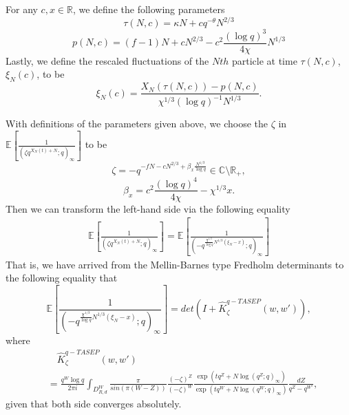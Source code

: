 \begin{definition}
For any $c,x \in \mathbb{R}$, we define the following parameters
\begin{equation*}
\tau(N,c) = \kappa N + cq^{-\theta}N^{2/3}
\end{equation*}
\begin{equation*}
p(N,c) = (f-1)N + cN^{2/3} - c^2 \frac{(\log q)^3}{4 \chi} N^{1/3}
\end{equation*}
Lastly, we define the rescaled fluctuations of the $Nth$ particle at time $\tau(N,c)$, $\xi_N(c)$, to be $$\xi_N(c) = \frac{X_N(\tau(N,c)) - p(N,c)}{\chi^{1/3} (\log q)^{-1} N^{1/3}}.$$
\end{definition}

With definitions of the parameters given above, we choose the $\zeta$ in $\mathbb{E} \left[ \frac{1}{(\zeta q^{X_N(t)+N}; q)_{\infty}} \right]$ to be 
\begin{equation*}
\zeta = -q^{-fN - cN^{2/3} + \beta_x \frac{N^{1/3}}{\log q}} \in \mathbb{C} \setminus \mathbb{R}_+,
\end{equation*}
\begin{equation*}
\beta_x = c^2 \frac{(\log q)^4}{4 \chi} - \chi^{1/3} x.
\end{equation*}
Then we can transform the left-hand side via the following equality
\begin{align*}
\mathbb{E} \left[ \frac{1}{(\zeta q^{X_N(t)+N}; q)_{\infty}} \right] = \mathbb{E} \left[ \frac{1}{\left( -q^{ \frac{\chi^{1/3}}{\log q} N^{1/3} (\xi_N - x) }; q \right)_{\infty}} \right]
\end{align*}
That is, we have arrived from the Mellin-Barnes type Fredholm determinants to the following equality that 
\begin{equation}
\label{new-equality-mb-type}
\mathbb{E} \left[ \frac{1}{\left( -q^{ \frac{\chi^{1/3}}{\log q} N^{1/3} (\xi_N - x) }; q \right)_{\infty}} \right] = det(I+\hat{K}_{\zeta}^{q-TASEP}(w,w')),
\end{equation}
where 
\begin{align*}
& \quad \hat{K}_{\zeta}^{q-TASEP}(w,w') \\
& = \frac{q^W \log q}{2 \pi i} \int_{D^W_{R,d}} \frac{\pi}{sin(\pi (W-Z))} \frac{(-\zeta)^Z}{(-\zeta)^W} \frac{\exp(tq^Z+N\log(q^Z;q)_{\infty})}{\exp(tq^W+N\log(q^W;q)_{\infty})} \frac{dZ}{q^Z - q^{W'}},
\end{align*}
given that both side converges absolutely.